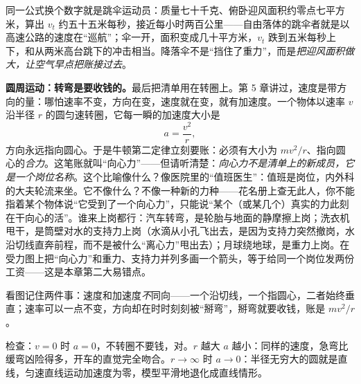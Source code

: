 同一公式换个数字就是跳伞运动员：质量七十千克、俯卧迎风面积约零点七平方米，算出 \(v_t\) 约五十五米每秒，接近每小时两百公里——自由落体的跳伞者就是以高速公路的速度在“巡航”；伞一开，面积变成几十平方米，\(v_t\) 跌到五米每秒上下，和从两米高台跳下的冲击相当。降落伞不是“挡住了重力”，而是\emph{把迎风面积做大，让空气早点把账接过去}。

\textbf{圆周运动：转弯是要收钱的。}最后把清单用在转圈上。第 5 章讲过，速度是带方向的量：哪怕速率不变，方向在变，速度就在变，就有加速度。一个物体以速率 \(v\) 沿半径 \(r\) 的圆匀速转圈，它每一瞬的加速度大小是
\[
a=\frac{v^2}{r},
\]
方向永远指向圆心。于是牛顿第二定律立刻要账：必须有大小为 \(mv^2/r\)、指向圆心的\emph{合力}。这笔账就叫“向心力”——但请听清楚：\emph{向心力不是清单上的新成员，它是一个岗位名称}。这个比喻像什么？像医院里的“值班医生”：值班是岗位，内外科的大夫轮流来坐。它不像什么？不像一种新的力种——花名册上查无此人，你不能指着某个物体说“它受到了一个向心力”，只能说“某个（或某几个）真实的力此刻在干向心的活”。谁来上岗都行：汽车转弯，是轮胎与地面的静摩擦上岗；洗衣机甩干，是筒壁对水的支持力上岗（水滴从小孔飞出去，是因为支持力突然撤岗，水沿切线直奔前程，而不是被什么“离心力”甩出去）；月球绕地球，是重力上岗。在受力图上把“向心力”和重力、支持力并列多画一个箭头，等于给同一个岗位发两份工资——这是本章第二大易错点。

\begin{center}
\end{center}

看图记住两件事：速度和加速度\emph{不}同向——一个沿切线，一个指圆心，二者始终垂直；速率可以一点不变，方向却在时时刻刻被“掰弯”，掰弯就要收钱，账是 \(mv^2/r\)。

检查：\(v=0\) 时 \(a=0\)，不转圈不要钱，对。\(r\) 越大 \(a\) 越小：同样的速度，急弯比缓弯凶险得多，开车的直觉完全吻合。\(r\to\infty\) 时 \(a\to0\)：半径无穷大的圆就是直线，匀速直线运动加速度为零，模型平滑地退化成直线情形。

